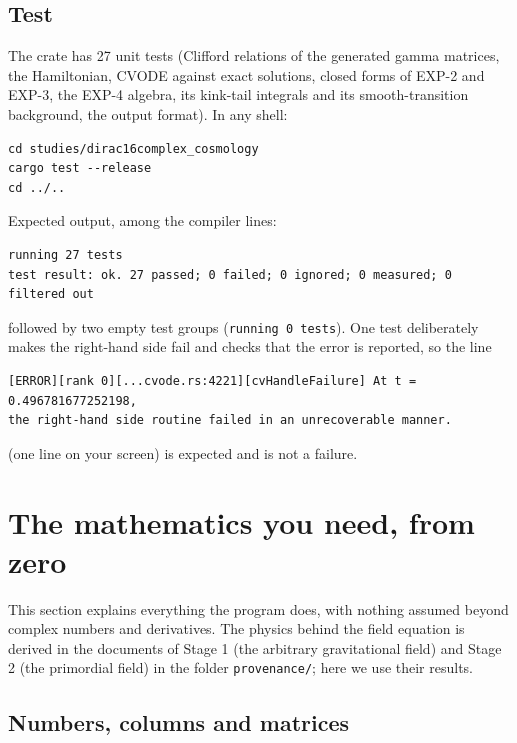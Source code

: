 \documentclass[11pt]{article}
\begin{document}
\subsection{Test}

The crate has 27 unit tests (Clifford relations of the generated gamma matrices, the Hamiltonian, CVODE against exact solutions, closed forms of EXP-2 and EXP-3, the EXP-4 algebra, its kink-tail integrals and its smooth-transition background, the output format). In any shell:

\begin{Verbatim}[fontsize=\small]
cd studies/dirac16complex_cosmology
cargo test --release
cd ../..
\end{Verbatim}

Expected output, among the compiler lines:

\begin{Verbatim}[fontsize=\small]
running 27 tests
test result: ok. 27 passed; 0 failed; 0 ignored; 0 measured; 0 filtered out
\end{Verbatim}

followed by two empty test groups (\texttt{running \allowbreak{}0 tests}). One test deliberately makes the right-hand side fail and checks that the error is reported, so the line

\begin{Verbatim}[fontsize=\small]
[ERROR][rank 0][...cvode.rs:4221][cvHandleFailure] At t = 0.496781677252198,
the right-hand side routine failed in an unrecoverable manner.
\end{Verbatim}

(one line on your screen) is expected and is not a failure.

\section{The mathematics you need, from zero}

This section explains everything the program does, with nothing assumed beyond complex numbers and derivatives. The physics behind the field equation is derived in the documents of Stage 1 (the arbitrary gravitational field) and Stage 2 (the primordial field) in the folder \texttt{provenan\allowbreak{}ce/}; here we use their results.

\subsection{Numbers, columns and matrices}
\end{document}
